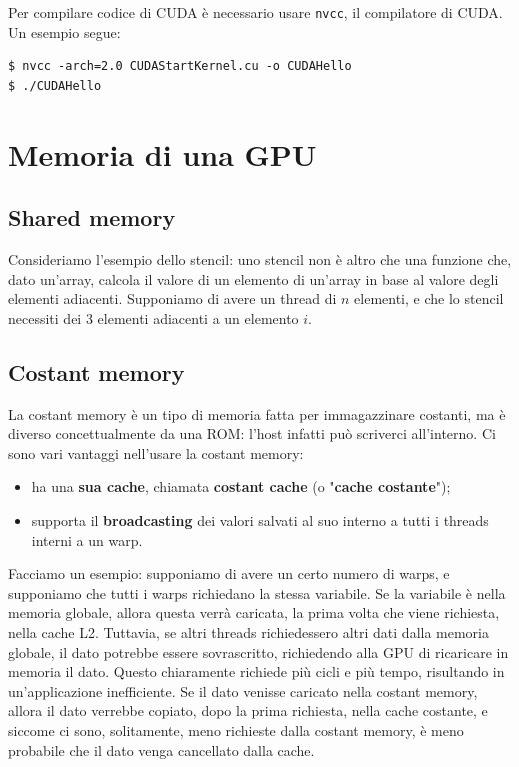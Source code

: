 Per compilare codice di CUDA è necessario usare \verb|nvcc|, il compilatore di CUDA. Un esempio segue:

\begin{terminal}
    \begin{lstlisting}[style = notexterm]
$ nvcc -arch=2.0 CUDAStartKernel.cu -o CUDAHello
$ ./CUDAHello\end{lstlisting}
\end{terminal}

\section{Memoria di una GPU}


\subsection{Shared memory}

Consideriamo l'esempio dello stencil: uno stencil non è altro che una funzione che, dato un'array, calcola il valore di un elemento di un'array in base al valore degli elementi adiacenti. Supponiamo di avere un thread di $n$ elementi, e che lo stencil necessiti dei 3 elementi adiacenti a un elemento $i$. 
\nl

\subsection{Costant memory}

La costant memory è un tipo di memoria fatta per immagazzinare costanti, ma è diverso concettualmente da una ROM: l'host infatti può scriverci all'interno. Ci sono vari vantaggi nell'usare la costant memory:
\begin{itemize}
    \item ha una \textbf{sua cache}, chiamata \textbf{costant cache} (o "\textbf{cache costante}");
    \item supporta il \textbf{broadcasting} dei valori salvati al suo interno a tutti i threads interni a un warp.
\end{itemize}

Facciamo un esempio: supponiamo di avere un certo numero di warps, e supponiamo che tutti i warps richiedano la stessa variabile. Se la variabile è nella memoria globale, allora questa verrà caricata, la prima volta che viene richiesta, nella cache L2. Tuttavia, se altri threads richiedessero altri dati dalla memoria globale, il dato potrebbe essere sovrascritto, richiedendo alla GPU di ricaricare in memoria il dato. Questo chiaramente richiede più cicli e più tempo, risultando in un'applicazione inefficiente.
\nl
Se il dato venisse caricato nella costant memory, allora il dato verrebbe copiato, dopo la prima richiesta, nella cache costante, e siccome ci sono, solitamente, meno richieste dalla costant memory, è meno probabile che il dato venga cancellato dalla cache.

